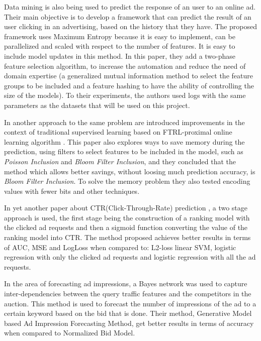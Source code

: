 Data mining is also being used to predict the response of an user to an online
ad\cite{chapelle2013simple}. Their main objective is to develop a framework that
can predict the result of an user clicking in an advertising, based on
the history that they have.
The proposed framework uses Maximum Entropy\cite{Nigam99usingmaximum}
because it is easy to implement, can be parallelized and scaled with respect
to the number of features. It is easy to include model updates in this method.
In this paper, they add a two-phase feature selection algorithm, to increase the
automation and reduce the need of domain expertise (a generalized mutual
information method to select the feature groups to be included and a feature
hashing to have the ability of controlling the size of the models). To their
experiments, the authors used logs with the same parameters as the datasets that
will be used on this project.

In another approach to the same problem are introduced improvements in the context of traditional
supervised learning based on FTRL-proximal online learning algorithm
\cite{McMahan:2013:ACP:2487575.2488200}. This paper also explores ways
to save memory during the prediction, using filters to select features to be
included in the model, such as \emph{Poisson Inclusion} and \emph{Bloom Filter
Inclusion}, and they concluded that the method which allows better savings,
without loosing much prediction accuracy, is \emph{Bloom Filter Inclusion}. To
solve the memory problem they also tested encoding values with fewer bits and
other techniques.

In yet another paper about CTR(Click-Through-Rate) prediction
\cite{Tagami:2013:CPC:2501040.2501978}, a two stage approach is used, the first
stage being the construction of a ranking model with the clicked ad requests and then a
sigmoid function converting the value of the ranking model into CTR. The method
proposed achieves better results in terms of AUC, MSE and LogLoss when compared
to: L2-loss linear SVM, logistic regression with only the clicked ad requests and
logistic regression with all the ad requests.

In the area of forecasting ad impressions, a Bayes network was used to capture
inter-dependencies between the query traffic features and the competitors in the
auction\cite{nath2013ad}. This method is used to forecast the number of
impressions of the ad to a certain keyword based on the bid that is done. Their
method, Generative Model based Ad Impression Forecasting Method, get better
results in terms of accuracy when compared to Normalized Bid Model. 

